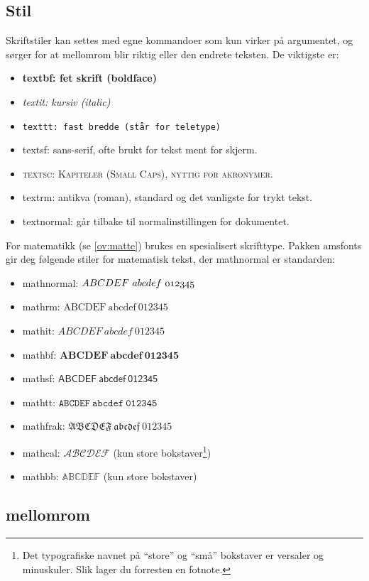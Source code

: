 \subsection{Stil}
Skriftstiler kan settes med egne kommandoer som kun virker på argumentet, og sørger for at
mellomrom blir riktig eller den endrete teksten. De viktigste er:
\begin{itemize}
	\item \textbf{textbf: fet skrift (boldface)}
	\item \textit{textit: kursiv (italic)}
	\item \texttt{texttt: fast bredde (står for teletype)}
	\item \textsf{textsf: sans-serif, ofte brukt for tekst ment for skjerm.}
	\item \textsc{textsc: Kapiteler (Small Caps), nyttig for akronymer.}
	\item \textrm{textrm: antikva (roman), standard og det vanligste for trykt tekst.}
	\item \textnormal{textnormal: går tilbake til  normalinstillingen for dokumentet.}
\end{itemize}

For matematikk (se \cref{ov:matte}) brukes en spesialisert skrifttype. Pakken
amsfonts gir deg følgende stiler for matematisk tekst, der mathnormal er standarden:
\begin{itemize}
	\item mathnormal: \(\mathnormal{ABCDEF~abcdef~012345}\)
	\item mathrm: \(\mathrm{ABCDEF~abcdef~012345}\)
	\item mathit: \(\mathit{ABCDEF~abcdef~012345}\)
	\item mathbf: \(\mathbf{ABCDEF~abcdef~012345}\)
	\item mathsf: \(\mathsf{ABCDEF~abcdef~012345}\)
	\item mathtt: \(\mathtt{ABCDEF~abcdef~012345}\)
	\item mathfrak: \(\mathfrak{ABCDEF~abcdef~012345}\)
	\item mathcal: \(\mathcal{ABCDEF}\) (kun store bokstaver\footnote{
		Det typografiske navnet på ``store'' og ``små'' bokstaver er versaler og minuskuler.
		Slik lager du forresten en fotnote.})
	\item mathbb: \(\mathbb{ABCDEF}\) (kun store bokstaver)
\end{itemize}

\subsection{mellomrom}

